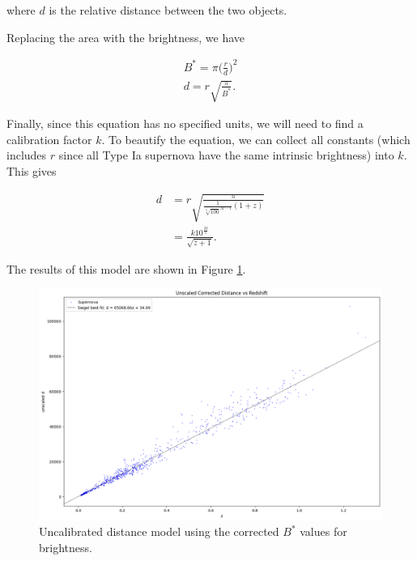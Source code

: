 \documentclass{article}
\begin{document}
where $d$ is the relative distance between the two objects.

Replacing the area with the brightness, we have

\begin{equation}
\begin{aligned}
  B^{*} = \pi \bigg(\frac{r}{d}\bigg)^2 \\
      d = r \sqrt{\frac{\pi}{B^*}}.
\end{aligned}
\end{equation}

Finally, since this equation has no specified units, we will need to find a calibration factor $k$. To beautify the equation, we can collect all constants (which includes $r$ since all Type Ia supernova have the same intrinsic brightness) into $k$. This gives

\begin{equation}
\begin{aligned}
  d &= r \sqrt{\frac{\pi}{\frac{1}{\sqrt[5]{100}^{M - 1}}(1 + z)}} \\
    &= \frac{k 10^\frac{M}{5}}{\sqrt{z + 1}}.
\end{aligned}
\end{equation}

The results of this model are shown in Figure \ref{fig:corrected_uncalibrated}.

\begin{figure}[h!]
  \includegraphics[width=\linewidth]{../graphs/corrected_uncalibrated.png}
  \caption{Uncalibrated distance model using the corrected $B^*$ values for
  brightness.}
  \label{fig:corrected_uncalibrated}
\end{figure}
\end{document}
